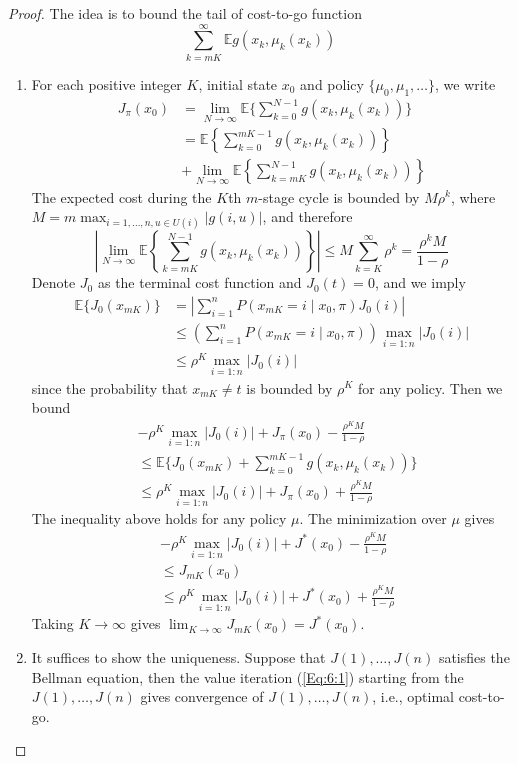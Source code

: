 \begin{proof}
The idea is to bound the tail of cost-to-go function
\[
\sum_{k=mK}^\infty\mathbb{E}g(x_k,\mu_k(x_k))
\]
\begin{enumerate}
\item
For each positive integer $K$, initial state $x_0$ and policy $\{\mu_0,\mu_1,\dots\}$, we write
\begin{align*}
J_{\pi}(x_0)&=\lim_{N\to\infty}\mathbb{E}\Bigg\{\sum_{k=0}^{N-1}g(x_k,\mu_k(x_k))\Bigg\}\\
&=\mathbb{E}\left\{\sum_{k=0}^{mK-1}g(x_k,\mu_k(x_k))\right\}\\
&+\lim_{N\to\infty}\mathbb{E}\left\{
\sum_{k=mK}^{N-1}g(x_k,\mu_k(x_k))
\right\}
\end{align*}
The expected cost during the $K$th $m$-stage cycle is bounded by $M\rho^k$, where $M=m\max_{i=1,\dots,n, u\in U(i)}|g(i,u)|$, and therefore
\[
\left|
\lim_{N\to\infty}\mathbb{E}\left\{
\sum_{k=mK}^{N-1}g(x_k,\mu_k(x_k))
\right\}
\right|\le M\sum_{k=K}^\infty\rho^k=\frac{\rho^kM}{1-\rho}
\]
Denote $J_0$ as the terminal cost function and $J_0(t)=0$, and we imply
\begin{align*}
\mathbb{E}\{J_0(x_{mK})\}&=\left|\sum_{i=1}^nP(x_{mK}=i\mid x_0,\pi)J_0(i)\right|\\
&\le\left(\sum_{i=1}^nP(x_{mK}=i\mid x_0,\pi)\right)\max_{i=1:n}|J_0(i)|\\
&\le\rho^K\max_{i=1:n}|J_0(i)|
\end{align*}
since the probability that $x_{mK}\ne t$ is bounded by $\rho^K$ for any policy.
Then we bound
\begin{align*}
&-\rho^K\max_{i=1:n}|J_0(i)|+J_{\pi}(x_0)-\frac{\rho^KM}{1-\rho}\\
&\le\mathbb{E}\{J_0(x_{mK})+\sum_{k=0}^{mK-1}g(x_k,\mu_k(x_k))\}\\
&\le\rho^K\max_{i=1:n}|J_0(i)| + J_{\pi}(x_0)+\frac{\rho^KM}{1-\rho}
\end{align*}
The inequality above holds for any policy $\mu$. The minimization over $\mu$ gives
\begin{align*}
&-\rho^K\max_{i=1:n}|J_0(i)|+J^*(x_0)-\frac{\rho^KM}{1-\rho}\\
&\le J_{mK}(x_0)\\
&\le\rho^K\max_{i=1:n}|J_0(i)| + J^*(x_0)+\frac{\rho^KM}{1-\rho}
\end{align*}
Taking $K\to\infty$ gives $\lim_{K\to\infty}J_{mK}(x_0) = J^*(x_0)$.
\item
It suffices to show the uniqueness. Suppose that $J(1),\dots,J(n)$ satisfies the Bellman equation, then the value iteration (\ref{Eq:6:1}) starting from the $J(1),\dots,J(n)$ gives convergence of $J(1),\dots,J(n)$, i.e., optimal cost-to-go.

\end{enumerate}
\end{proof}

